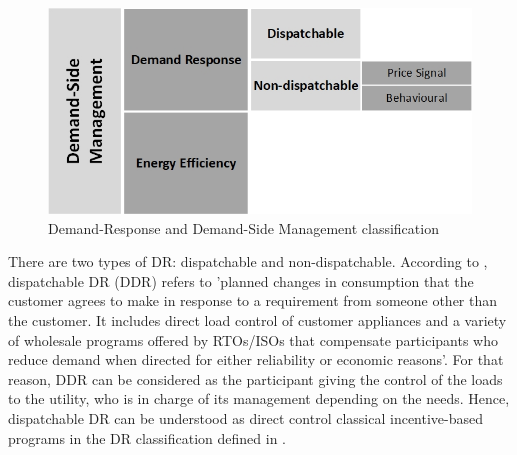 \begin{figure}[]
	\centering
	\includegraphics[width=0.4\columnwidth ]{ChapterIntro/Figures/DRDSM_BW.jpg}
		\caption{Demand-Response and Demand-Side Management classification}  
\end{figure}

There are two types of DR: dispatchable and non-dispatchable. According to \cite{DNVGLEnergy2014}, dispatchable DR (DDR) refers to 'planned changes in consumption that the customer agrees to make in response to a requirement from someone other than the customer. It includes direct load control of customer appliances and a variety of wholesale programs offered by RTOs/ISOs that compensate participants who reduce demand when directed for either reliability or economic reasons'. For that reason, DDR can be considered as the participant giving
the control of the loads to the utility, who is in charge of its management depending on the needs. Hence, dispatchable DR can be understood as direct control classical incentive-based programs in the DR classification defined in \cite{albadi2008summary}.

